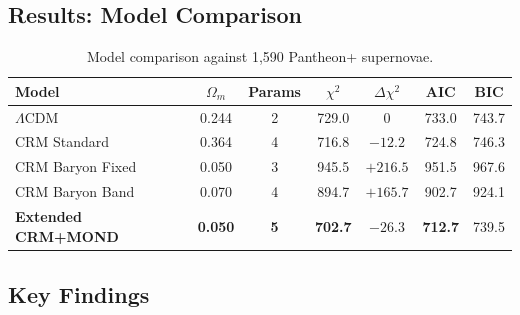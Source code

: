 \documentclass[aps,prd,twocolumn,superscriptaddress,nofootinbib]{revtex4-2}
\begin{document}
\subsection{Results: Model Comparison}

\begin{table}
\centering
\caption{Model comparison against 1,590 Pantheon+ supernovae.}
\label{tab:comparison}
\begin{tabular}{lcccccc}
\toprule
\textbf{Model} & $\Omega_m$ & \textbf{Params} & $\chi^2$ & $\Delta\chi^2$ & AIC & BIC \\
\midrule
$\Lambda$CDM & 0.244 & 2 & 729.0 & 0 & 733.0 & 743.7 \\
CRM Standard & 0.364 & 4 & 716.8 & $-12.2$ & 724.8 & 746.3 \\
\midrule
CRM Baryon Fixed & 0.050 & 3 & 945.5 & $+216.5$ & 951.5 & 967.6 \\
CRM Baryon Band & 0.070 & 4 & 894.7 & $+165.7$ & 902.7 & 924.1 \\
\midrule
\textbf{Extended CRM+MOND} & \textbf{0.050} & \textbf{5} & \textbf{702.7} & $\mathbf{-26.3}$ & \textbf{712.7} & 739.5 \\
\bottomrule
\end{tabular}
\end{table}

\subsection{Key Findings}
\end{document}
